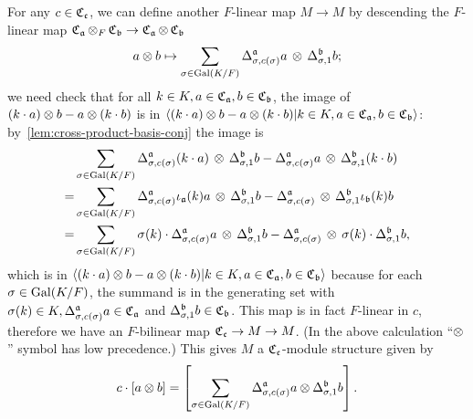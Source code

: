 \begin{construction}[$M$]
  For any $c \in \operatorname{\mathfrak{C}}_{\mathfrak{c}}$, we can define another $F$-linear map $M \to M$ by descending the $F$-linear map $\operatorname{\mathfrak{C}}_{\mathfrak{a}}\otimes_{F}\operatorname{\mathfrak{C}}_{\mathfrak{b}} \to \operatorname{\mathfrak{C}}_{\mathfrak{a}}\otimes \operatorname{\mathfrak{C}}_{\mathfrak{b}}$
  \[
      a \otimes b \mapsto \sum_{\sigma\in\operatorname{Gal}(K/F)} \Delta^{\mathfrak{a}}_{\sigma,c(\sigma)}a \, \otimes \, \Delta^{\mathfrak{b}}_{\sigma, 1}b;
    \]
    we need check that for all $k \in K, a \in\operatorname{\mathfrak{C}}_{\mathfrak{a}}, b \in \operatorname{\mathfrak{C}}_{\mathfrak{b}}$, the image of $(k\cdot a)\otimes b - a \otimes (k\cdot b)$ is in
    $\left\langle (k\cdot a)\otimes b - a \otimes (k\cdot b) | k \in K, a \in \operatorname{\mathfrak{C}}_{\mathfrak{a}}, b \in \operatorname{\mathfrak{C}}_{\mathfrak{b}} \right\rangle$: by~\cref{lem:cross-product-basis-conj} the image is
    \[
\begin{aligned}
      & \sum_{\sigma\in\operatorname{Gal}(K/F)}
      \Delta^{\mathfrak{a}}_{\sigma, c(\sigma)}(k \cdot a) \,\otimes\, \Delta^{\mathfrak{b}}_{\sigma, 1}b
      -
        \Delta^{\mathfrak{a}}_{\sigma, c(\sigma)}a \,\otimes\, \Delta^{\mathfrak{b}}_{\sigma, 1}(k \cdot b) \\
  = & \sum_{\sigma\in\operatorname{Gal}(K/F)}
      \Delta^{\mathfrak{a}}_{\sigma,c(\sigma)}\iota_{\mathfrak{a}}(k)a \,\otimes\, \Delta^{\mathfrak{b}}_{\sigma,1}b
      -
      \Delta^{\mathfrak{a}}_{\sigma,c(\sigma)} \,\otimes\, \Delta^{\mathfrak{b}}_{\sigma, 1}\iota_{\mathfrak{b}}(k)b \\
  =& \sum_{\sigma\in\operatorname{Gal}(K/F)}
     \sigma(k)\cdot\Delta^{\mathfrak{a}}_{\sigma, c(\sigma)}a \,\otimes\, \Delta^{\mathfrak{b}}_{\sigma, 1}b
     - \Delta^{\mathfrak{a}}_{\sigma, c(\sigma)} \,\otimes\, \sigma(k)\cdot\Delta^{\mathfrak{b}}_{\sigma,1}b,
  \end{aligned}
\]
which is in $\left\langle (k\cdot a)\otimes b - a \otimes (k\cdot b) | k \in K, a \in \operatorname{\mathfrak{C}}_{\mathfrak{a}}, b \in \operatorname{\mathfrak{C}}_{\mathfrak{b}} \right\rangle$ because for each $\sigma \in \operatorname{Gal}(K/F)$, the summand is in the generating set with $\sigma(k) \in K, \Delta^{\mathfrak{a}}_{\sigma, c(\sigma)}a \in \operatorname{\mathfrak{C}}_{\mathfrak{a}}$ and $\Delta^{\mathfrak{b}}_{\sigma, 1}b \in \operatorname{\mathfrak{C}}_{\mathfrak{b}}$. This map is in fact $F$-linear in $c$, therefore we have an $F$-bilinear map $\operatorname{\mathfrak{C}}_{\mathfrak{c}}\to M \to M$. (In the above calculation ``$\otimes$'' symbol has low precedence.) This gives $M$ a $\operatorname{\mathfrak{C}}_{\mathfrak{c}}$-module structure given by
\[
  c \cdot [a \otimes b] = \left[\sum_{\sigma\in\operatorname{Gal}(K/F)}\Delta^{\mathfrak{a}}_{\sigma, c(\sigma)}a \otimes \Delta^{\mathfrak{b}}_{\sigma, 1}b\right].
\]


  \leanok
\end{construction}

